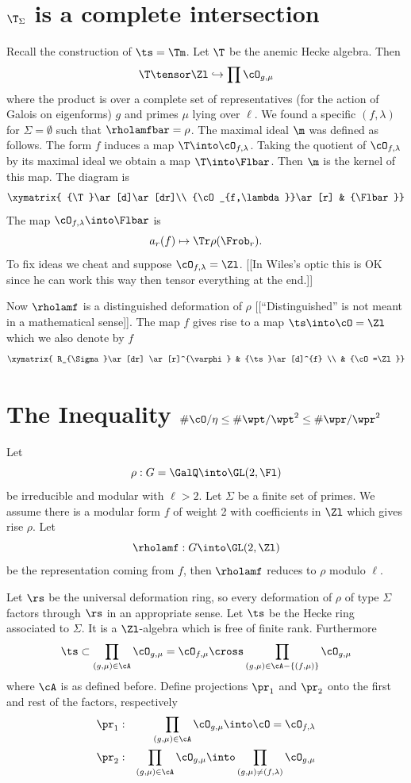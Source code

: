\documentclass{report}
\begin{document}
\section{$\T_{\Sigma}$ is a complete intersection}

Recall the construction of $\ts=\Tm$.
Let $\T$ be the anemic Hecke algebra. Then
$$\T\tensor\Zl\hookrightarrow\prod \cO_{g,\mu}$$
where the product is over a complete set of representatives
(for the action of Galois on eigenforms)
$g$ and primes $\mu$ lying over $\ell$.
We found a specific $(f,\lambda)$ for $\Sigma=\emptyset$ such that
$\rholamfbar=\rho$. The maximal ideal $\m$ was defined as follows.
The form $f$ induces a map $\T\into\cO_{f,\lambda}$. Taking the quotient
of $\cO_{f,\lambda}$ by its maximal ideal we obtain a
map $\T\into\Flbar$. Then $\m$ is the kernel of this map.
The diagram is
$$\xymatrix{
  {\T}\ar[d]\ar[dr]\\
{\cO_{f,\lambda}}\ar[r] & {\Flbar}}$$
The map $\cO_{f,\lambda}\into\Flbar$ is
$$a_r(f)\mapsto\Tr\rho(\Frob_r).$$
To fix ideas we cheat and suppose $\cO_{f,\lambda}=\Zl$.
[[In Wiles's optic this is OK since he can work this way then
tensor everything at the end.]]

Now $\rholamf$ is a distinguished deformation of $\rho$ [[``Distinguished''
is not meant in a mathematical sense]]. The map $f$ gives rise to a map
$\ts\into\cO=\Zl$ which we also denote by $f$
$$\xymatrix{
R_{\Sigma}\ar[dr] \ar[r]^{\varphi} & {\ts}\ar[d]^{f} \\
        & {\cO=\Zl}}$$


\section{The Inequality $\#\cO/\eta\leq\#\wpt/\wpt^2\leq \# \wpr/\wpr^2$}
Let
   $$\rho:G=\GalQ\into\GL(2,\Fl)$$
be irreducible and modular with $\ell>2$. Let $\Sigma$ be a finite
set of primes.
We assume there
is a modular form $f$ of weight 2 with
coefficients in $\Zl$ which gives rise $\rho$.
Let
$$\rholamf:G\into\GL(2,\Zl)$$
be the representation coming from $f$, then $\rholamf$
reduces to $\rho$ modulo $\ell$.


Let $\rs$ be the universal deformation ring, so every deformation
of $\rho$ of type $\Sigma$ factors through $\rs$ in an appropriate sense.
Let $\ts$ be the Hecke ring associated to $\Sigma$. It is a $\Zl$-algebra
which is free of finite rank. Furthermore
$$\ts\subset\prod_{(g,\mu)\in \cA} \cO_{g,\mu}
           =\cO_{f,\mu}\cross \prod_{(g,\mu)\in \cA-\{(f,\mu)\}}\cO_{g,\mu}$$
where $\cA$ is as defined before.
Define projections $\pr_1$ and $\pr_2$ onto the first and rest of the factors,
respectively
\begin{eqnarray*}
\pr_1&:&\prod_{(g,\mu)\in\cA}\cO_{g,\mu}\into\cO=\cO_{f,\lambda}\\
\pr_2&:&\prod_{(g,\mu)\in\cA}\cO_{g,\mu}\into
         \prod_{(g,\mu)\neq(f,\lambda)}\cO_{g,\mu}
\end{eqnarray*}
\end{document}
